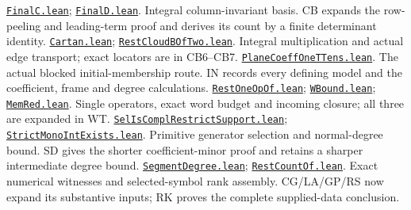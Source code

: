 \documentclass[11pt,a4paper]{article}
\numberwithin{equation}{section}
\theoremstyle{remark}\newtheorem{remark}[theorem]{Remark}
\newcommand{\src}[2]{\href{https://github.com/CocoSgt/riemann-hypothesis-lean/blob/7cbf7a0c32fca1badf05931879a37c3f8a2b03b4/src/#1}{\texttt{#2}}}
\begin{document}
\begin{thebibliography}{99}
 \src{Formalism/GradedWeylDivisibility/FinalC.lean}{FinalC.lean}; \src{Formalism/GradedWeylDivisibility/FinalD.lean}{FinalD.lean}. Integral column-invariant basis. CB expands the row-peeling and leading-term proof and derives its count by a finite determinant identity.
 \src{Formalism/LocalToGlobal/GroupLattices/FockModels/Cartan.lean}{Cartan.lean}; \src{Formalism/SharpRestriction/GrowthBounds/DualFockLinear/RestCloudBOfTwo.lean}{RestCloudBOfTwo.lean}. Integral multiplication and actual edge transport; exact locators are in CB6--CB7.
 \src{Formalism/SharpRestriction/GrowthBounds/PlaneCoefficients/PlaneCoeffOneTTens.lean}{PlaneCoeffOneTTens.lean}. The actual blocked initial-membership route. IN records every defining model and the coefficient, frame and degree calculations.
 \src{Formalism/SharpRestriction/GrowthBounds/PlaneCoefficients/RestOneOpOf.lean}{RestOneOpOf.lean}; \src{Formalism/SharpRestriction/GrowthBounds/PlaneCoefficients/WBound.lean}{WBound.lean}; \src{Formalism/SharpRestriction/GrowthBounds/TwistedSubstitution/MemRed.lean}{MemRed.lean}. Single operators, exact word budget and incoming closure; all three are expanded in WT.
 \src{Formalism/SharpRestriction/GrowthBounds/SegmentDegree/SelIsComplRestrictSupport.lean}{SelIsComplRestrictSupport.lean}; \src{Formalism/SharpRestriction/GrowthBounds/SegmentDegree/StrictMonoIntExists.lean}{StrictMonoIntExists.lean}. Primitive generator selection and normal-degree bound. SD gives the shorter coefficient-minor proof and retains a sharper intermediate degree bound.
 \src{Formalism/SharpRestriction/GrowthBounds/SegmentDegree.lean}{SegmentDegree.lean}; \src{Formalism/SharpRestriction/GrowthBounds/SegmentDegree/RestCountOf.lean}{RestCountOf.lean}. Exact numerical witnesses and selected-symbol rank assembly. CG/LA/GP/RS now expand its substantive inputs; RK proves the complete supplied-data conclusion.


\end{thebibliography}
\end{document}
